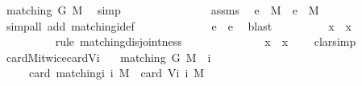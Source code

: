 \begin{isabellebody}
\ {\isachardoublequoteopen}matching\ G\ M{\isachardoublequoteclose}\ \isamarkupfalse%
\ simp\isanewline
\ \ \ \ \ \ \isamarkupfalse%
\isanewline
\ \ \ \ \ \ \isamarkupfalse%
\ {}\ assms\ \isamarkupfalse%
\ {\isachardoublequoteopen}e{}\ {\isasymin}\ M{\isachardoublequoteclose}\ \ {\isachardoublequoteopen}e{}\ {\isasymin}\ M{\isachardoublequoteclose}\isanewline
\ \ \ \ \ \ \ \ \isamarkupfalse%
\ {\isacharparenleft}simp{\isacharunderscore}all\ add{\isacharcolon}\ matching{\isacharunderscore}i{\isacharunderscore}def{\isacharparenright}\isanewline
\ \ \ \ \ \ \isamarkupfalse%
\ \isamarkupfalse%
\ {}\ {}\ \isamarkupfalse%
\ {\isachardoublequoteopen}e{}\ {\isasymnoteq}\ e{}{\isachardoublequoteclose}\ \isamarkupfalse%
\ blast\isanewline
\ \ \ \ \ \ \isamarkupfalse%
\ \isamarkupfalse%
\ {\isachardoublequoteopen}x{}\ {\isasyminter}\ x{}\ {\isacharequal}\ {\isacharbraceleft}{\isacharbraceright}{\isachardoublequoteclose}\ \isamarkupfalse%
\ {}\ \isanewline
\ \ \ \ \ \ \ \ \isamarkupfalse%
\ {\isacharparenleft}rule\ matching{\isacharunderscore}disjointness{\isacharparenright}\isanewline
\ \ \ \ \isacommand{{\isacharbraceright}}\isamarkupfalse%
\isanewline
\ \ \ \ \isamarkupfalse%
\ {}\ {}\ \isamarkupfalse%
\ {\isachardoublequoteopen}x{}\ {\isasyminter}\ x{}\ {\isacharequal}\ {\isacharbraceleft}{\isacharbraceright}{\isachardoublequoteclose}\ \isamarkupfalse%
\ clarsimp\isanewline
\ \ \isamarkupfalse%
\isanewline
{}\isamarkupfalse%
%
\endisatagproof
{\isafoldproof}%
%
\isadelimproof
\isanewline
%
\endisadelimproof
\isanewline
{}\isamarkupfalse%
\ card{\isacharunderscore}Mi{\isacharunderscore}twice{\isacharunderscore}card{\isacharunderscore}Vi{\isacharcolon}\isanewline
\ \ \ {\isachardoublequoteopen}matching\ G\ M\ {\isasymand}\ i\ {\isachargreater}\ {}{\isachardoublequoteclose}\isanewline
\ \ \ {\isachardoublequoteopen}{}\ {\isacharasterisk}\ card\ {\isacharparenleft}matching{\isacharunderscore}i\ i\ M{\isacharparenright}\ {\isacharequal}\ card\ {\isacharparenleft}V{\isacharunderscore}i\ i\ M{\isacharparenright}{\isachardoublequoteclose}\isanewline

\end{isabellebody}
